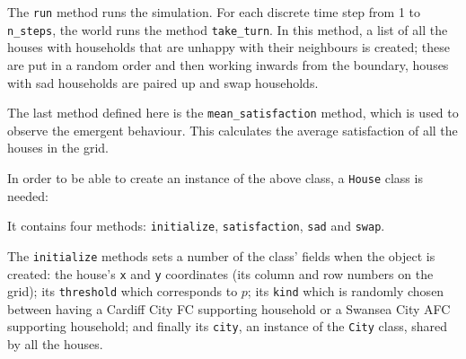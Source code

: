 The \texttt{run} method runs the simulation. For each discrete time
step from 1 to \texttt{n_steps}, the world runs the method
\texttt{take_turn}.
In this method, a list of all the houses with households that
are unhappy with their neighbours is created;
these are put in a random order and then working inwards from the boundary,
houses with sad households are paired up and swap households.

The last method defined here is the \texttt{mean_satisfaction}
method, which is used to observe the emergent behaviour.
This calculates the average satisfaction of all the houses in the grid.

In order to be able to create an instance of the above class,
a \texttt{House} class is needed:


It contains four methods: \texttt{initialize},
\texttt{satisfaction}, \texttt{sad} and \texttt{swap}.

The \texttt{initialize} methods sets a number of the class' fields when
the object is created: the house's \texttt{x} and \texttt{y}
coordinates (its column and row numbers on the grid); its
\texttt{threshold} which corresponds to \(p\); its \texttt{kind}
which is randomly chosen between having a Cardiff City
FC supporting household or a Swansea City AFC supporting household; and finally
its \texttt{city}, an instance of the \texttt{City} class, shared
by all the houses.

